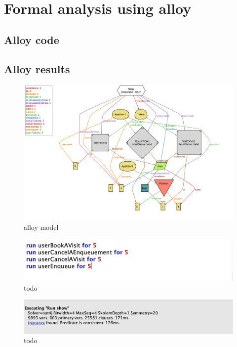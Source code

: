 \section{Formal analysis using alloy}
\label{sect:formalanalysisusingalloy}

\subsection{Alloy code}
\label{subsect:alloycode}


\subsection{Alloy results}
\label{subsect:alloyresults}

\begin{figure}[h!]
    \centering
    \includegraphics[width=\textwidth]{Images/alloy/alloymodel.png}
    \caption{\label{fig:alloymodel}{alloy model}}
\end{figure}

\begin{figure}[h!]
    \centering
    \includegraphics[width=\textwidth]{Images/alloy/runs.png}
    \caption{\label{fig:runs}{todo}}
\end{figure}

\begin{figure}[h!]
    \centering
    \includegraphics[width=\textwidth]{Images/alloy/runshow.png}
    \caption{\label{fig:runshow}{todo}}
\end{figure}

